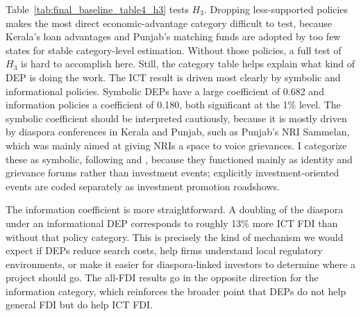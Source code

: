 \documentclass[12pt]{article}
\begin{document}
Table~\ref{tab:final_baseline_table4_h3} tests $H_3$. Dropping less-supported policies makes the most direct economic-advantage category difficult to test, because Kerala's loan advantages and Punjab's matching funds are adopted by too few states for stable category-level estimation. Without those policies, a full test of $H_3$ is hard to accomplish here. Still, the category table helps explain what kind of DEP is doing the work. The ICT result is driven most clearly by symbolic and informational policies. Symbolic DEPs have a large coefficient of 0.682 and information policies a coefficient of 0.180, both significant at the 1\% level. The symbolic coefficient should be interpreted cautiously, because it is mostly driven by diaspora conferences in Kerala and Punjab, such as Punjab's NRI Sammelan, which was mainly aimed at giving NRIs a space to voice grievances. I categorize these as symbolic, following \citet{gamlen_emigration_2008} and \citet{ragazzi_comparative_2014}, because they functioned mainly as identity and grievance forums rather than investment events; explicitly investment-oriented events are coded separately as investment promotion roadshows.

The information coefficient is more straightforward. A doubling of the diaspora under an informational DEP corresponds to roughly 13\% more ICT FDI than without that policy category. This is precisely the kind of mechanism we would expect if DEPs reduce search costs, help firms understand local regulatory environments, or make it easier for diaspora-linked investors to determine where a project should go. The all-FDI results go in the opposite direction for the information category, which reinforces the broader point that DEPs do not help general FDI but do help ICT FDI.


\end{document}
